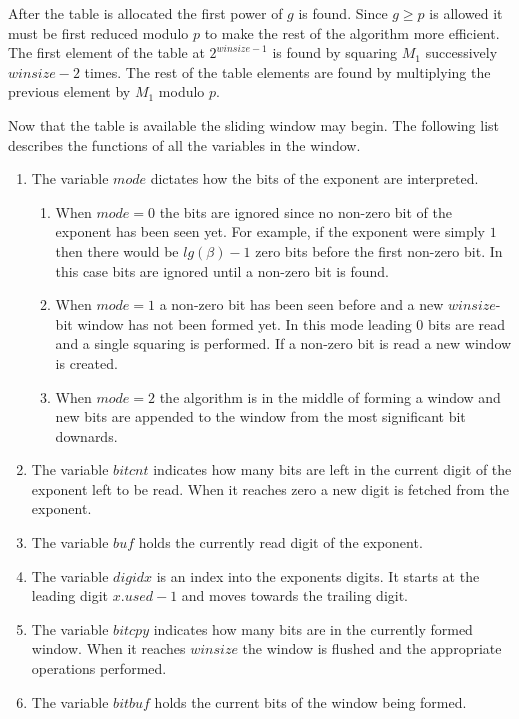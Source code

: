 \documentclass[b5paper]{book}
\begin{document}
After the table is allocated the first power of $g$ is found.  Since $g \ge p$ is allowed it must be first reduced modulo $p$ to make
the rest of the algorithm more efficient.  The first element of the table at $2^{winsize - 1}$ is found by squaring $M_1$ successively $winsize - 2$
times.  The rest of the table elements are found by multiplying the previous element by $M_1$ modulo $p$.

Now that the table is available the sliding window may begin.  The following list describes the functions of all the variables in the window.
\begin{enumerate}
\item The variable $mode$ dictates how the bits of the exponent are interpreted.  
\begin{enumerate}
   \item When $mode = 0$ the bits are ignored since no non-zero bit of the exponent has been seen yet.  For example, if the exponent were simply 
         $1$ then there would be $lg(\beta) - 1$ zero bits before the first non-zero bit.  In this case bits are ignored until a non-zero bit is found.  
   \item When $mode = 1$ a non-zero bit has been seen before and a new $winsize$-bit window has not been formed yet.  In this mode leading $0$ bits 
         are read and a single squaring is performed.  If a non-zero bit is read a new window is created.  
   \item When $mode = 2$ the algorithm is in the middle of forming a window and new bits are appended to the window from the most significant bit
         downards.
\end{enumerate}
\item The variable $bitcnt$ indicates how many bits are left in the current digit of the exponent left to be read.  When it reaches zero a new digit
      is fetched from the exponent.
\item The variable $buf$ holds the currently read digit of the exponent. 
\item The variable $digidx$ is an index into the exponents digits.  It starts at the leading digit $x.used - 1$ and moves towards the trailing digit.
\item The variable $bitcpy$ indicates how many bits are in the currently formed window.  When it reaches $winsize$ the window is flushed and
      the appropriate operations performed.
\item The variable $bitbuf$ holds the current bits of the window being formed.  
\end{enumerate}
\end{document}
